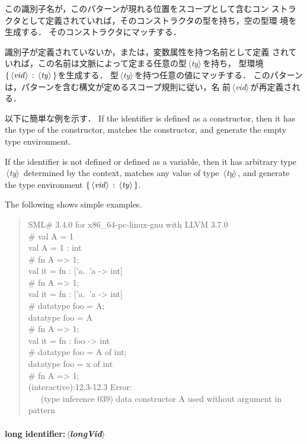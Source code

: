 \documentclass{jbook}
\newcommand{\txt}[2]{#2}
\newcommand{\version}{3.4.0}
\newcommand{\nonterm}[1]{\mbox{$\,\langle$}{\it #1}\mbox{$\rangle\,$}}
\newenvironment{program}{\begin{quote}\begin{tt}}%
                        {\end{tt}\end{quote}}
\begin{document}
\ifjp%
	この識別子名が，このパターンが現れる位置をスコープとして含むコン
ストラクタとして定義されていれば，そのコンストラクタの型を持ち，空の型環
境を生成する．
	そのコンストラクタにマッチする．

	識別子が定義されていないか，または，変数属性を持つ名前として定義
されていれば，この名前は文脈によって定まる任意の型\nonterm{ty}を持ち，
型環境$\{\nonterm{vid} : \nonterm{ty}\}$を生成する．
	型\nonterm{ty}を持つ任意の値にマッチする．
	このパターンは，パターンを含む構文が定めるスコープ規則に従い，名
前\nonterm{vid}が再定義される．
	
	以下に簡単な例を示す．
\else%
	If the identifier is defined as a constructor, then it has the
type of the constructor, matches the constructor, and generate the empty
type environment.

	If the identifier is not defined or defined as a variable, then
it has arbitrary type \nonterm{ty} determined by the context, matches any
value of type \nonterm{ty}, and generate the type environment
$\{\nonterm{vid} : \nonterm{ty}\}$. 
	
	The following shows simple examples.
\fi%
\begin{program}
SML\# \version{} for x86\_64-pc-linux-gnu with LLVM 3.7.0
\\
\# val A = 1
\\
val A = 1 : int
\\
\# fn A => 1;
\\
val it = fn : ['a.~'a -> int]
\\
\# fn A => 1;
\\
val it = fn : ['a.~'a -> int]
\\
\# datatype foo = A;
\\
datatype foo = A
\\
\# fn A => 1;
\\
val it = fn : foo -> int
\\
\# datatype foo = A of int;
\\
datatype foo = x of int
\\
\# fn A => 1;
\\
(interactive):12.3-12.3 Error:
\\
\ \ \  (type inference 039) data constructor A used without argument in pattern
\end{program}	

\paragraph{\txt{long識別子パターン}{long identifier}:\nonterm{longVid}}
\end{document}
